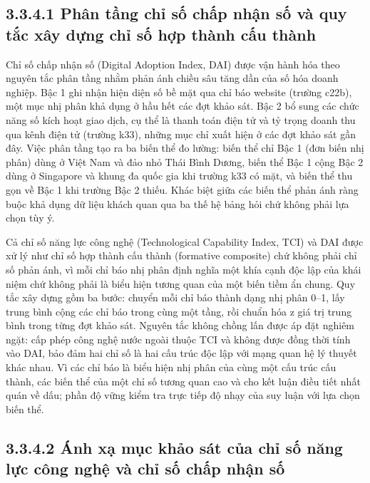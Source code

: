 \documentclass[
  a4paper,
  13pt]{extreport}
\begin{document}
\hypertarget{phuxe2n-tux1ea7ng-chux1ec9-sux1ed1-chux1ea5p-nhux1eadn-sux1ed1-vuxe0-quy-tux1eafc-xuxe2y-dux1ef1ng-chux1ec9-sux1ed1-hux1ee3p-thuxe0nh-cux1ea5u-thuxe0nh}{%
\subsection{3.3.4.1 Phân tầng chỉ số chấp nhận số và quy tắc xây dựng
chỉ số hợp thành cấu
thành}\label{phuxe2n-tux1ea7ng-chux1ec9-sux1ed1-chux1ea5p-nhux1eadn-sux1ed1-vuxe0-quy-tux1eafc-xuxe2y-dux1ef1ng-chux1ec9-sux1ed1-hux1ee3p-thuxe0nh-cux1ea5u-thuxe0nh}}

Chỉ số chấp nhận số (Digital Adoption Index, DAI) được vận hành hóa theo
nguyên tắc phân tầng nhằm phản ánh chiều sâu tăng dần của số hóa doanh
nghiệp. Bậc 1 ghi nhận hiện diện số bề mặt qua chỉ báo website (trường
c22b), một mục nhị phân khả dụng ở hầu hết các đợt khảo sát. Bậc 2 bổ
sung các chức năng số kích hoạt giao dịch, cụ thể là thanh toán điện tử
và tỷ trọng doanh thu qua kênh điện tử (trường k33), những mục chỉ xuất
hiện ở các đợt khảo sát gần đây. Việc phân tầng tạo ra ba biến thể đo
lường: biến thể chỉ Bậc 1 (đơn biến nhị phân) dùng ở Việt Nam và đảo nhỏ
Thái Bình Dương, biến thể Bậc 1 cộng Bậc 2 dùng ở Singapore và khung đa
quốc gia khi trường k33 có mặt, và biến thể thu gọn về Bậc 1 khi trường
Bậc 2 thiếu. Khác biệt giữa các biến thể phản ánh ràng buộc khả dụng dữ
liệu khách quan qua ba thế hệ bảng hỏi chứ không phải lựa chọn tùy ý.

Cả chỉ số năng lực công nghệ (Technological Capability Index, TCI) và
DAI được xử lý như chỉ số hợp thành cấu thành (formative composite) chứ
không phải chỉ số phản ánh, vì mỗi chỉ báo nhị phân định nghĩa một khía
cạnh độc lập của khái niệm chứ không phải là biểu hiện tương quan của
một biến tiềm ẩn chung. Quy tắc xây dựng gồm ba bước: chuyển mỗi chỉ báo
thành dạng nhị phân 0--1, lấy trung bình cộng các chỉ báo trong cùng một
tầng, rồi chuẩn hóa z giá trị trung bình trong từng đợt khảo sát. Nguyên
tắc không chồng lấn được áp đặt nghiêm ngặt: cấp phép công nghệ nước
ngoài thuộc TCI và không được đồng thời tính vào DAI, bảo đảm hai chỉ số
là hai cấu trúc độc lập với mạng quan hệ lý thuyết khác nhau. Vì các chỉ
báo là biểu hiện nhị phân của cùng một cấu trúc cấu thành, các biến thể
của một chỉ số tương quan cao và cho kết luận điều tiết nhất quán về
dấu; phần độ vững kiểm tra trực tiếp độ nhạy của suy luận với lựa chọn
biến thể.

\hypertarget{uxe1nh-xux1ea1-mux1ee5c-khux1ea3o-suxe1t-cux1ee7a-chux1ec9-sux1ed1-nux103ng-lux1ef1c-cuxf4ng-nghux1ec7-vuxe0-chux1ec9-sux1ed1-chux1ea5p-nhux1eadn-sux1ed1}{%
\subsection{3.3.4.2 Ánh xạ mục khảo sát của chỉ số năng lực công nghệ và
chỉ số chấp nhận
số}\label{uxe1nh-xux1ea1-mux1ee5c-khux1ea3o-suxe1t-cux1ee7a-chux1ec9-sux1ed1-nux103ng-lux1ef1c-cuxf4ng-nghux1ec7-vuxe0-chux1ec9-sux1ed1-chux1ea5p-nhux1eadn-sux1ed1}}
\end{document}
